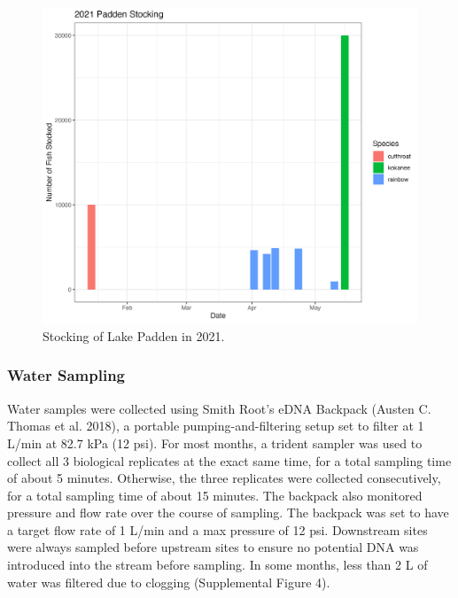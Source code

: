 \documentclass[
]{article}
\begin{document}
\begin{figure}
\centering
\includegraphics{../Output/SupplementalFigures/stocking_2021only.png}
\caption{Stocking of Lake Padden in 2021.}
\end{figure}

\hypertarget{water-sampling}{%
\subsubsection{Water Sampling}\label{water-sampling}}

Water samples were collected using Smith Root's eDNA Backpack (Austen C.
Thomas et al. 2018), a portable pumping-and-filtering setup set to
filter at 1 L/min at 82.7 kPa (12 psi). For most months, a trident
sampler was used to collect all 3 biological replicates at the exact
same time, for a total sampling time of about 5 minutes. Otherwise, the
three replicates were collected consecutively, for a total sampling time
of about 15 minutes. The backpack also monitored pressure and flow rate
over the course of sampling. The backpack was set to have a target flow
rate of 1 L/min and a max pressure of 12 psi. Downstream sites were
always sampled before upstream sites to ensure no potential DNA was
introduced into the stream before sampling. In some months, less than 2
L of water was filtered due to clogging (Supplemental Figure 4).
\end{document}
